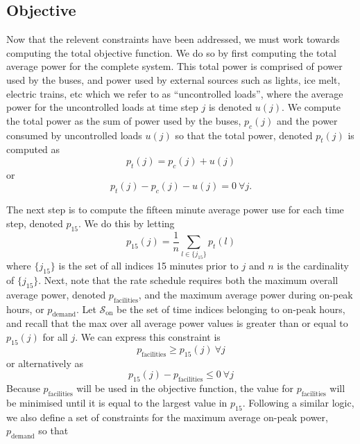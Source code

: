 \subsection{Objective\label{sec:objective}}
\par Now that the relevent constraints have been addressed, we must work towards computing the total objective function. We do so by first computing the total average power for the complete system. This total power is comprised of power used by the buses, and power used by external sources such as lights, ice melt, electric trains, etc which we refer to as ``uncontrolled loads'', where the average power for the uncontrolled loads at time step $j$ is denoted $u(j)$. We compute the total power as the sum of power used by the buses, $p_c(j)$ and the power consumed by uncontrolled loads $u(j)$ so that the total power, denoted $p_t(j)$ is computed as 
\begin{equation*}
	p_t(j) = p_c(j) + u(j)
\end{equation*}
or 
\begin{equation}\label{eqn:objective:pt}
	p_t(j) - p_c(j) - u(j) = 0 \ \forall j.
\end{equation}
\par The next step is to compute the fifteen minute average power use for each time step, denoted $p_{\text{15}}$. We do this by letting 
\begin{equation}\label{eqn:objective:p15}
p_{\text{15}}(j) = \frac{1}{n}\sum_{l \in \{j_{15}\}}p_t(l)
\end{equation}
where $\{j_{15}\}$ is the set of all indices 15 minutes prior to $j$ and $n$ is the cardinality of $\{j_{15}\}$.
Next, note that the rate schedule requires both the maximum overall average power, denoted $p_{\text{facilities}}$, and the maximum average power during on-peak hours, or $p_{\text{demand}}$. Let $\mathcal{S}_{\text{on}}$ be the set of time indices belonging to on-peak hours, and recall that the max over all average power values is greater than or equal to $p_{15}(j)$ for all $j$. We can express this constraint is
\begin{equation*}
	p_{\text{facilities}} \ge p_{15}(j) \ \forall j
\end{equation*}
or alternatively as
\begin{equation}\label{eqn:objective:pFac}
	p_{15}(j) - p_{\text{facilities}} \le 0 \ \forall j
\end{equation}
Because $p_{\text{facilities}}$ will be used in the objective function, the value for $p_{\text{facilities}}$ will be minimised until it is equal to the largest value in $p_{15}$. Following a similar logic, we also define a set of constraints for the maximum average on-peak power, $p_{\text{demand}}$ so that
